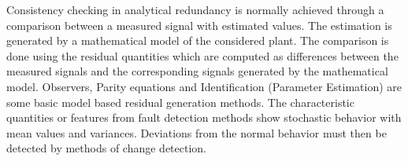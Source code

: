 Consistency checking in analytical redundancy is normally achieved through a comparison between a measured signal with
estimated values. The estimation is generated by a mathematical model of the considered plant. The comparison is done
using the residual quantities which are computed as differences between the measured signals and the corresponding
signals generated by the mathematical model. Observers, Parity equations and Identification (Parameter Estimation) are
some basic model based residual generation methods. The characteristic quantities or features from fault detection
methods show stochastic behavior with mean values and variances. Deviations from the normal behavior must then be
detected by methods of change detection.





